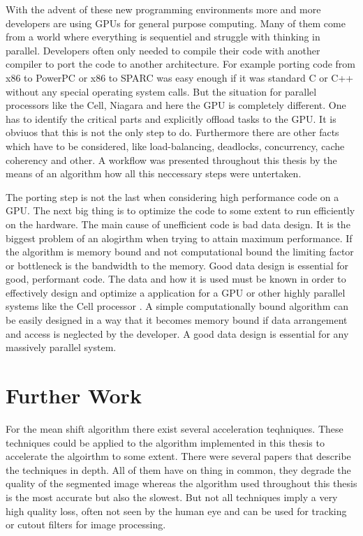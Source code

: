 With the advent of these new programming environments more and more developers
are using \glspl{GPU} for general purpose computing. Many of them come from a
world where everything is sequentiel and struggle with thinking in parallel.
Developers often only needed to compile their code with another compiler to
port the code to another architecture. For example porting code from x86
to PowerPC or x86 to \gls{SPARC}  was easy enough if it was standard C or C++
without any special operating system calls. But the situation for parallel
processors like the Cell, Niagara and here the \gls{GPU} is completely
different. One has to identify the critical parts and explicitly offload tasks
to the \gls{GPU}. It is obviuos that this is not the only step to do.
Furthermore there are other facts which have to be considered, like
load-balancing, deadlocks, concurrency, cache coherency and other. A workflow
was presented throughout this thesis by the means of an algorithm how all this
neccessary steps were untertaken.

The porting step is not the last when considering high performance code on a
\gls{GPU}. The next big thing is to optimize the code to some extent to run
efficiently on the hardware. The main cause of unefficient code is bad data
design. It is the biggest problem of an alogirthm when trying to attain maximum
performance. If the algorithm is memory bound and not computational bound the
limiting factor or bottleneck is the bandwidth to the memory. Good data design
is essential for good, performant code. The data and how it is used must be
known in order to effectively design and optimize a application for a \gls{GPU}
or other highly parallel systems like the Cell processor
\citep{citeulike:80546}. A simple computationally bound algorithm can be easily
designed in a way that it becomes memory bound if data arrangement and access is
neglected by the developer. A good data design is essential for any massively
parallel system.


\section{Further Work} %
\label{sec:further_work}
For the mean shift algorithm there exist several acceleration teqhniques. These
techniques could be applied to the algorithm implemented in this thesis to
accelerate the algoirthm to some extent. There were several papers that describe
the techniques in depth. All of them have on thing in common, they degrade the
quality of the segmented image whereas the algorithm used throughout this thesis
is the most accurate but also the slowest. But not all techniques imply a very high
quality loss, often not seen by the human eye and can be used for tracking or
cutout filters for image processing. 

